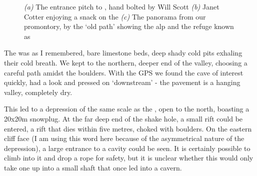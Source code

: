 \begin{figure}[t!]
\checkoddpage \ifoddpage \forcerectofloat \else \forceversofloat \fi
    \centering
    \begin{subfigure}[t]{0.59\textwidth}
        \centering
        \caption{} \label{Will Scott bolting}
    \end{subfigure}
    \hfill
    \begin{subfigure}[t]{0.393\textwidth}
        \centering
        \caption{} \label{Ice}
    \end{subfigure}

    \vspace{0.3cm}
    \begin{subfigure}[t]{\textwidth}
    \centering
        \caption{} \label{Panorama}
    \end{subfigure}
    \caption{
    \emph{(a)} The entrance pitch to \protect{}, hand bolted by Will Scott
    \emph{(b)} Janet Cotter enjoying a snack on the \protect{}
    \emph{(c)} The panorama from our promontory, by the `old \protect{} path' showing the \protect{} alp and the refuge known as \protect{} }
\end{figure}


The  was as I remembered, bare limestone beds, deep shady cold pits exhaling their cold breath. We kept to the northern, deeper end of the valley, choosing a careful path amidst the boulders. With the GPS we found the cave of interest quickly, had a look and pressed on `downstream' - the pavement is a hanging valley, completely dry. 

This led to  a depression of the same scale as the , open to the north, boasting a 20x20m snowplug. At the far deep end of the shake hole, a small rift could be entered, a rift that dies within five metres, choked with boulders. On the eastern cliff face  (I am using this word here because of the asymmetrical nature of the depression), a large entrance to a cavity could be seen. It is certainly possible to climb into it and drop a rope for safety, but it is unclear whether this would only take one up into a small shaft that once led into a cavern. 

